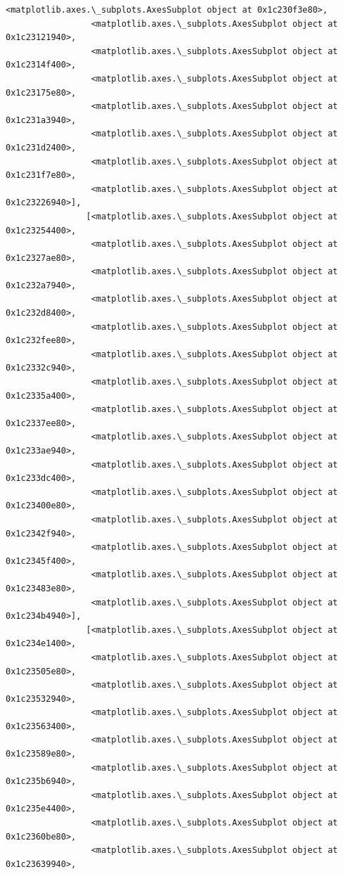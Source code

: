 \documentclass[11pt]{article}
\begin{document}
\begin{Verbatim}[commandchars=\\\{\}]
                 <matplotlib.axes.\_subplots.AxesSubplot object at 0x1c230f3e80>,
                 <matplotlib.axes.\_subplots.AxesSubplot object at 0x1c23121940>,
                 <matplotlib.axes.\_subplots.AxesSubplot object at 0x1c2314f400>,
                 <matplotlib.axes.\_subplots.AxesSubplot object at 0x1c23175e80>,
                 <matplotlib.axes.\_subplots.AxesSubplot object at 0x1c231a3940>,
                 <matplotlib.axes.\_subplots.AxesSubplot object at 0x1c231d2400>,
                 <matplotlib.axes.\_subplots.AxesSubplot object at 0x1c231f7e80>,
                 <matplotlib.axes.\_subplots.AxesSubplot object at 0x1c23226940>],
                [<matplotlib.axes.\_subplots.AxesSubplot object at 0x1c23254400>,
                 <matplotlib.axes.\_subplots.AxesSubplot object at 0x1c2327ae80>,
                 <matplotlib.axes.\_subplots.AxesSubplot object at 0x1c232a7940>,
                 <matplotlib.axes.\_subplots.AxesSubplot object at 0x1c232d8400>,
                 <matplotlib.axes.\_subplots.AxesSubplot object at 0x1c232fee80>,
                 <matplotlib.axes.\_subplots.AxesSubplot object at 0x1c2332c940>,
                 <matplotlib.axes.\_subplots.AxesSubplot object at 0x1c2335a400>,
                 <matplotlib.axes.\_subplots.AxesSubplot object at 0x1c2337ee80>,
                 <matplotlib.axes.\_subplots.AxesSubplot object at 0x1c233ae940>,
                 <matplotlib.axes.\_subplots.AxesSubplot object at 0x1c233dc400>,
                 <matplotlib.axes.\_subplots.AxesSubplot object at 0x1c23400e80>,
                 <matplotlib.axes.\_subplots.AxesSubplot object at 0x1c2342f940>,
                 <matplotlib.axes.\_subplots.AxesSubplot object at 0x1c2345f400>,
                 <matplotlib.axes.\_subplots.AxesSubplot object at 0x1c23483e80>,
                 <matplotlib.axes.\_subplots.AxesSubplot object at 0x1c234b4940>],
                [<matplotlib.axes.\_subplots.AxesSubplot object at 0x1c234e1400>,
                 <matplotlib.axes.\_subplots.AxesSubplot object at 0x1c23505e80>,
                 <matplotlib.axes.\_subplots.AxesSubplot object at 0x1c23532940>,
                 <matplotlib.axes.\_subplots.AxesSubplot object at 0x1c23563400>,
                 <matplotlib.axes.\_subplots.AxesSubplot object at 0x1c23589e80>,
                 <matplotlib.axes.\_subplots.AxesSubplot object at 0x1c235b6940>,
                 <matplotlib.axes.\_subplots.AxesSubplot object at 0x1c235e4400>,
                 <matplotlib.axes.\_subplots.AxesSubplot object at 0x1c2360be80>,
                 <matplotlib.axes.\_subplots.AxesSubplot object at 0x1c23639940>,

\end{Verbatim}
\end{document}
